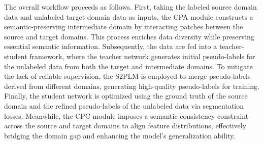 The overall workflow proceeds as follows. First, taking the labeled source domain data and unlabeled target domain data as inputs, the CPA module constructs a semantic-preserving intermediate domain by interacting patches between the source and target domains. This process enriches data diversity while preserving essential semantic information. Subsequently, the data are fed into a teacher-student framework, where the teacher network generates initial pseudo-labels for the unlabeled data from both the target and intermediate domains. To mitigate the lack of reliable supervision, the S2PLM is employed to merge pseudo-labels derived from different domains, generating high-quality pseudo-labels for training. Finally, the student network is optimized using the ground truth of the source domain and the refined pseudo-labels of the unlabeled data via segmentation losses. Meanwhile, the CPC module imposes a semantic consistency constraint across the source and target domains to align feature distributions, effectively bridging the domain gap and enhancing the model's generalization ability.

